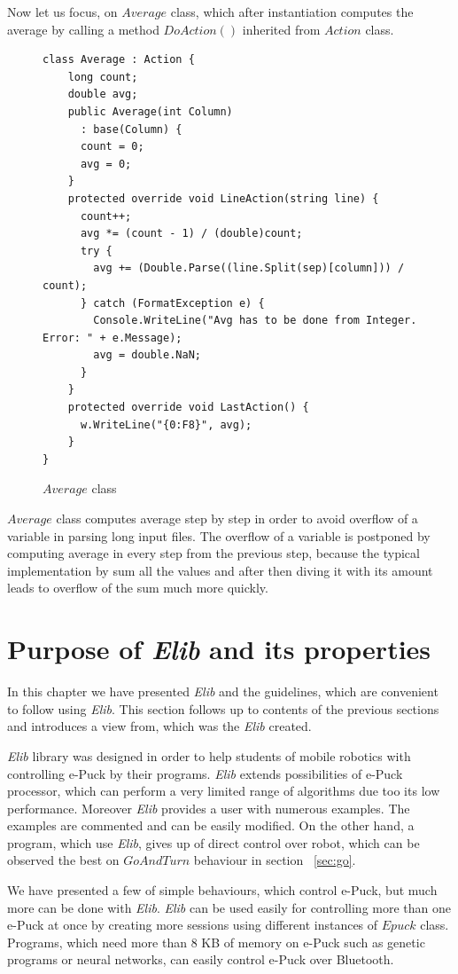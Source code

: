 \documentclass[12pt,notitlepage]{report}
\begin{document}
	Now let us focus, on $Average$ class, which after instantiation computes the average by calling a method $DoAction()$
	inherited from $Action$ class. 

\begin{figure}[!hbp]
\begin{lstlisting}
class Average : Action {
    long count;
    double avg;
    public Average(int Column)
      : base(Column) {
      count = 0;
      avg = 0;
    }
    protected override void LineAction(string line) {
      count++;
      avg *= (count - 1) / (double)count;
      try {
        avg += (Double.Parse((line.Split(sep)[column])) / count);
      } catch (FormatException e) {
        Console.WriteLine("Avg has to be done from Integer. Error: " + e.Message);
        avg = double.NaN;
      }
    }
    protected override void LastAction() {
      w.WriteLine("{0:F8}", avg);
    }
}
\end{lstlisting}
\caption{$Average$ class}\label{average}
\end{figure}

	$Average$ class computes average step by step in order to avoid 
	overflow of a variable in parsing long input files. The overflow
	of a variable is postponed by computing average in every step from the previous step, 
	because the typical implementation by sum all the values and after then diving it 
	with its amount leads to overflow of the sum much more quickly.

\section{Purpose of {\it Elib} and its properties}
	In this chapter we have presented {\it Elib} and the guidelines, which are convenient to follow using {\it Elib}. 
	This section follows up to contents of the previous sections and introduces a view from,
	which was the {\it Elib} created.

	{\it Elib} library was designed in order to help students of mobile robotics	with controlling e-Puck by their programs.
	{\it Elib} extends possibilities of e-Puck processor, which can perform a very limited range of algorithms
	due too its low performance.
	Moreover {\it Elib} provides a user with numerous examples. The examples are commented
	and can be easily modified.
	On the other hand, a program, which use {\it Elib}, gives up of direct control over robot,
	which can be observed the best on $GoAndTurn$ behaviour in section ~\ref{sec:go}.

	We have presented a few of simple behaviours, which control e-Puck, but much more can be done with {\it Elib}.
	{\it Elib} can be used easily for controlling more than one e-Puck at once by creating more sessions using
	different instances of $Epuck$ class. Programs, which need more than 8 KB of memory on e-Puck such 
	as genetic programs or neural networks, can easily control e-Puck over Bluetooth.
\end{document}
